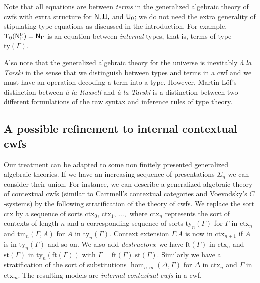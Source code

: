 \documentclass{mscs}
\newcommand{\FYI}[1]{{#1}}
\newcommand{\Ta}{\mathrm{T}}
\newcommand{\ctx}{\mathrm{ctx}}
\newcommand{\ty}{\mathrm{ty}}
\newcommand{\tm}{\mathrm{tm}}
\begin{document}
\begin{remark}\label{remark:typeequations}
Note that all equations are between {\em terms} in the generalized algebraic theory of cwfs with extra structure for $\mathsf{N}, \Pi,$ and $\mathsf{U}_0$; we do not need the extra generality of stipulating type equations as discussed in the introduction. For example, $\Ta_0(\N^0_\Gamma) = \N_\Gamma$ is an equation between {\em internal} types, that is, terms of type $\ty(\Gamma)$.
\end{remark}

\begin{remark}
Also note that the generalized algebraic theory for the universe is inevitably {\em \`a la Tarski} in the sense that we distinguish between types and terms in a cwf and we must have an operation decoding a term into a type. However, Martin-Löf's distinction between {\em \`a la Russell} and {\em \`a la Tarski} \cite{martinlof:padova} is a distinction between two different formulations of the raw syntax and inference rules of type theory.
\end{remark}

\subsection{A possible refinement to internal contextual cwfs}

Our treatment can be adapted to some non finitely presented generalized algebraic theories.
If we have an increasing sequence of \FYI{presentations} $\Sigma_n$ we can consider their
union.
For instance, we can describe a generalized algebraic theory of contextual cwfs \cite{castellan:lambek} (similar to Cartmell's contextual categories and Voevodsky's $C$-systems) by
the following stratification of the theory of cwfs. We replace the sort $\ctx$
by a sequence of sorts $\ctx_0,\,\ctx_1,\,\dots ,$ where $\ctx_n$ represents the sort
of contexts of length $n$ and a corresponding sequence of sorts
$\ty_n(\Gamma)$ for $\Gamma$ in $\ctx_n$
and $\tm_n(\Gamma,A)$ for $A$ in $\ty_n(\Gamma)$. Context extension $\Gamma.A$ is now in $\ctx_{n+1}$
if $A$ is in $\ty_n(\Gamma)$ and so on.
We also add {\em destructors}: we have
$\mathrm{ft}(\Gamma)$ in $\ctx_n$
and $\mathrm{st}(\Gamma)$ in $\ty_n(\mathrm{ft}(\Gamma))$
with $\Gamma = \mathrm{ft}(\Gamma).\mathrm{st}(\Gamma)$.
Similarly we have a stratification of the sort of substitutions
$\hom_{n,m}(\Delta,\Gamma)$ for $\Delta$ in $\ctx_n$ and $\Gamma$ in $\ctx_m$.
The resulting models are {\em internal contextual cwfs} in a cwf.
\end{document}
